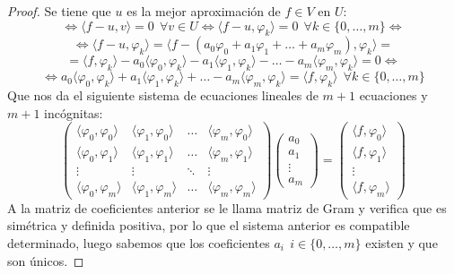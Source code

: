 \begin{proof}
    \noindent
    Se tiene que $u$ es la mejor aproximación de $f \in V$ en $U$:
    $$\Leftrightarrow \langle f-u, v\rangle = 0~~\forall v \in U \Leftrightarrow \langle f-u, \varphi_k\rangle = 0~~\forall k \in \{0, \ldots, m\} \Leftrightarrow$$
    $$\Leftrightarrow \langle f-u, \varphi_k\rangle = \langle f-(a_0\varphi_0 + a_1\varphi_1 + \ldots + a_m\varphi_m),\varphi_k\rangle = $$
    $$ =\langle f,\varphi_k \rangle -a_0 \langle \varphi_0,\varphi_k \rangle - a_1\langle \varphi_1,\varphi_k \rangle - \ldots - a_m \langle
        \varphi_m,\varphi_k \rangle = 0 \Leftrightarrow$$
    $$\Leftrightarrow a_0 \langle \varphi_0,\varphi_k \rangle + a_1\langle \varphi_1,\varphi_k \rangle + \ldots - a_m \langle
        \varphi_m,\varphi_k \rangle = \langle f,\varphi_k \rangle~~\forall k \in \{0, \ldots, m\}$$
    Que nos da el siguiente sistema de ecuaciones lineales de $m+1$ ecuaciones y $m+1$ incógnitas:
    $$\left( \begin{array}{cccc}
                \langle \varphi_0,\varphi_0 \rangle & \langle \varphi_1,\varphi_0 \rangle & \ldots & \langle \varphi_m,\varphi_0 \rangle \\
                \langle \varphi_0,\varphi_1 \rangle & \langle \varphi_1,\varphi_1 \rangle & \ldots & \langle \varphi_m,\varphi_1 \rangle \\
                \vdots                              & \vdots                              & \ddots & \vdots                              \\
                \langle \varphi_0,\varphi_m \rangle & \langle \varphi_1,\varphi_m \rangle & \ldots & \langle \varphi_m,\varphi_m \rangle
            \end{array} \right) \left( \begin{array}{c}
                a_0    \\
                a_1    \\
                \vdots \\
                a_m
            \end{array} \right) = \left( \begin{array}{c}
                \langle f,\varphi_0 \rangle \\
                \langle f,\varphi_1 \rangle \\
                \vdots                      \\
                \langle f,\varphi_m \rangle
            \end{array} \right)$$
    A la matriz de coeficientes anterior se le llama matriz de Gram y verifica que es simétrica y definida positiva, por lo que
    el sistema anterior es compatible determinado, luego sabemos que los coeficientes $a_i~~i\in\{0, \ldots, m\}$ existen y que
    son únicos.
\end{proof}


